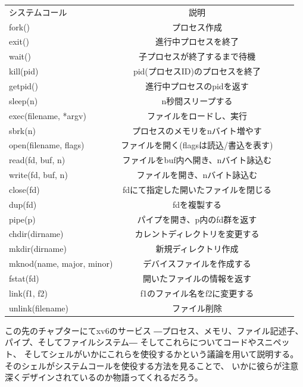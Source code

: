 \documentclass[11pt,a4paper, uplatex]{jsarticle}
\begin{document}
\begin{table}[htb]
  \begin{center}
    \begin{tabular}{lcrr}
      システムコール & 説明 \\
      fork() & プロセス作成 \\
      exit() & 進行中プロセスを終了 \\
      wait() & 子プロセスが終了するまで待機 \\
      kill(pid) & pid(プロセスID)のプロセスを終了 \\
      getpid() & 進行中プロセスのpidを返す \\
      sleep(n) & n秒間スリープする \\
      exec(filename, *argv) & ファイルをロードし、実行 \\
      sbrk(n) & プロセスのメモリをnバイト増やす \\
      open(filename, flags) & ファイルを開く(flagsは読込/書込を表す) \\
      read(fd, buf, n) & ファイルをbuf内へ開き、nバイト詠込む \\
      write(fd, buf, n) & ファイルを開き、nバイト詠込む \\
      close(fd) & fdにて指定した開いたファイルを閉じる \\
      dup(fd) & fdを複製する　\\
      pipe(p) & パイプを開き、p内のfd群を返す \\
      chdir(dirname) & カレントディレクトリを変更する \\
      mkdir(dirname) & 新規ディレクトリ作成 \\
      mknod(name, major, minor) & デバイスファイルを作成する \\
      fstat(fd) & 開いたファイルの情報を返す \\
      link(f1, f2) & f1のファイル名をf2に変更する \\
      unlink(filename) & ファイル削除 \\
    \end{tabular}
  \end{center}
  \label{tbl1}
\end{table}

この先のチャプターにてxv6のサービス
―プロセス、メモリ、ファイル記述子、パイプ、そしてファイルシステム―
そしてこれらについてコードやスニペット、
そしてシェルがいかにこれらを使役するかという議論を用いて説明する。
そのシェルがシステムコールを使役する方法を見ることで、
いかに彼らが注意深くデザインされているのか物語ってくれるだろう。
\end{document}
